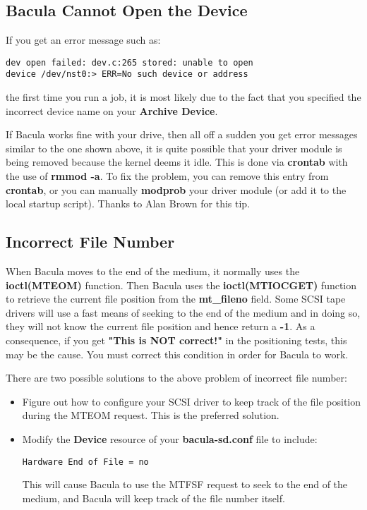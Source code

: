 \label{opendevice}
\subsection{Bacula Cannot Open the Device}

If you get an error message such as: 

\footnotesize
\begin{verbatim}
dev open failed: dev.c:265 stored: unable to open
device /dev/nst0:> ERR=No such device or address
\end{verbatim}
\normalsize

the first time you run a job, it is most likely due to the fact that you
specified the incorrect device name on your {\bf Archive Device}. 

If Bacula works fine with your drive, then all off a sudden you get error
messages similar to the one shown above, it is quite possible that your driver
module is being removed because the kernel deems it idle. This is done via
{\bf crontab} with the use of {\bf rmmod -a}. To fix the problem, you can
remove this entry from {\bf crontab}, or you can manually {\bf modprob} your
driver module (or add it to the local startup script). Thanks to Alan Brown
for this tip. 
\label{IncorrectFiles}

\subsection{Incorrect File Number}

When Bacula moves to the end of the medium, it normally uses the {\bf
ioctl(MTEOM)} function. Then Bacula uses the {\bf ioctl(MTIOCGET)} function to
retrieve the current file position from the {\bf mt\_fileno} field. Some SCSI
tape drivers will use a fast means of seeking to the end of the medium and in
doing so, they will not know the current file position and hence return a {\bf
-1}. As a consequence, if you get {\bf "This is NOT correct!"} in the
positioning tests, this may be the cause. You must correct this condition in
order for Bacula to work. 

There are two possible solutions to the above problem of incorrect file
number: 

\begin{itemize}
\item Figure out how to configure your SCSI driver to  keep track of the file
   position during the MTEOM  request. This is the preferred solution.  
\item Modify the {\bf Device} resource of your {\bf bacula-sd.conf} file  to
   include:  

\footnotesize
\begin{verbatim}
Hardware End of File = no
\end{verbatim}
\normalsize

This will cause Bacula to use the MTFSF request to  seek to the end of the
medium, and Bacula will keep  track of the file number itself. 
\end{itemize}

